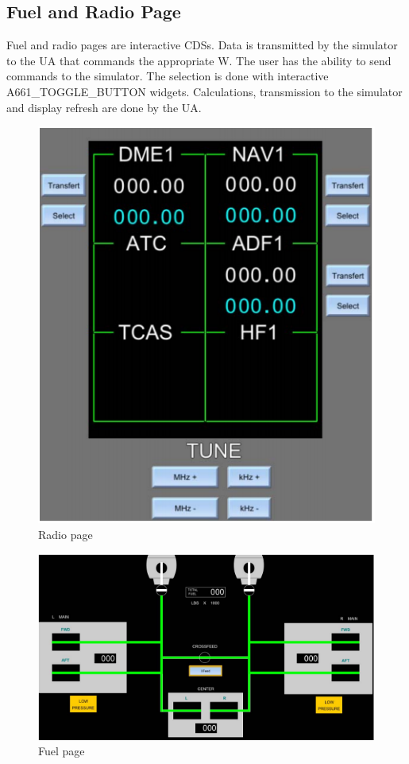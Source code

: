     \subsection{Fuel and Radio Page}
        Fuel and radio pages are interactive CDSs. Data is transmitted by the simulator to the UA that commands the appropriate W. 
        The user has the ability to send commands to the simulator. The selection is done with interactive A661\_TOGGLE\_BUTTON widgets. 
        Calculations, transmission to the simulator and display refresh are done by the UA.
        \begin{figure}[H]
            \centering
            \includegraphics[width=0.6\linewidth]{img/Radio-page.PNG}
            \caption{Radio page}
        \end{figure}
        \begin{figure}[H]
            \centering
            \includegraphics[width=0.6\linewidth]{img/Fuel.PNG}
            \caption{Fuel page}
        \end{figure}